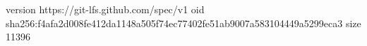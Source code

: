 version https://git-lfs.github.com/spec/v1
oid sha256:f4afa2d008fe412da1148a505f74ec77402fe51ab9007a583104449a5299eca3
size 11396
